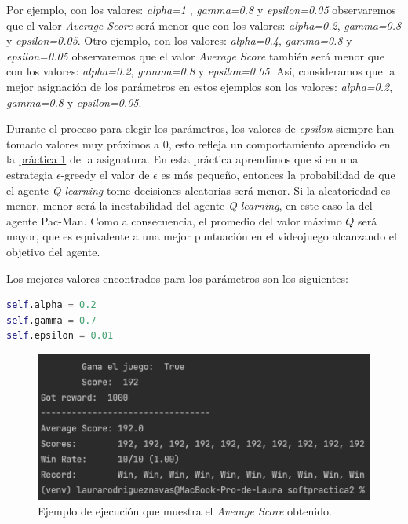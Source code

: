 \documentclass[11pt]{exam}
\begin{document}
Por ejemplo, con los valores: \textit{alpha=1} , \textit{gamma=0.8} y \textit{epsilon=0.05} observaremos que el valor \textit{Average Score} será menor que con los valores: \textit{alpha=0.2}, \textit{gamma=0.8} y \textit{epsilon=0.05}. Otro ejemplo, con los valores: \textit{alpha=0.4}, \textit{gamma=0.8} y \textit{epsilon=0.05} observaremos que el valor \textit{Average Score} también será menor que con los valores: \textit{alpha=0.2}, \textit{gamma=0.8} y \textit{epsilon=0.05}. Así, consideramos que la mejor asignación de los parámetros en estos ejemplos son los valores: \textit{alpha=0.2}, \textit{gamma=0.8} y \textit{epsilon=0.05}.

Durante el proceso para elegir los parámetros, los valores de \textit{epsilon} siempre han tomado valores muy próximos a 0, esto refleja un comportamiento aprendido en la \href{https://poliformat.upv.es/portal/site/ESP_0_2835/tool/c07b745a-0cfd-44f0-a7a2-9bb22f80c3f7?panel=Main}{práctica 1} de la asignatura. En esta práctica aprendimos que si en una estrategia $\epsilon$-greedy el valor de $\epsilon$ es más pequeño, entonces la probabilidad de que el agente \textit{Q-learning} tome decisiones aleatorias será menor. Si la aleatoriedad es menor, menor será la inestabilidad del agente \textit{Q-learning}, en este caso la del agente Pac-Man. Como a consecuencia, el promedio del valor máximo $Q$ será mayor, que es equivalente a una mejor puntuación en el videojuego alcanzando el objetivo del agente.
\vspace*{3mm}

Los mejores valores encontrados para los parámetros son los siguientes:
\vspace*{3mm}

\begin{lstlisting}[language=python, basicstyle=\footnotesize]
self.alpha = 0.2
self.gamma = 0.7
self.epsilon = 0.01
\end{lstlisting}

\begin{figure}[H]
	\centering
	\includegraphics[scale=0.5]{average_score}
	\caption{Ejemplo de ejecución que muestra el  \textit{Average Score} obtenido.}
	\label{average_score}
\end{figure}
\end{document}
